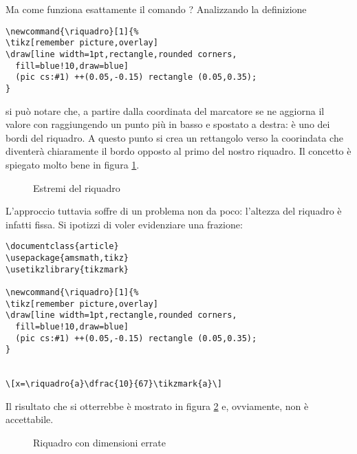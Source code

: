 Ma come funziona esattamente il comando ? Analizzando la definizione
\begin{lstlisting}[frame=lines]
\newcommand{\riquadro}[1]{%
\tikz[remember picture,overlay]
\draw[line width=1pt,rectangle,rounded corners,
  fill=blue!10,draw=blue]
  (pic cs:#1) ++(0.05,-0.15) rectangle (0.05,0.35);
}
\end{lstlisting}
si può notare che, a partire dalla coordinata del marcatore  se ne aggiorna il valore con  raggiungendo un punto più in basso e spostato a destra: è uno dei bordi del riquadro. A questo punto si crea un rettangolo verso la coorindata  che diventerà chiaramente il bordo opposto al primo del nostro riquadro. Il concetto è spiegato molto bene in figura \ref{fig:estremiriquadro}.

\begin{figure}[ht]
\centering
{}
\caption{Estremi del riquadro}
\label{fig:estremiriquadro}
\end{figure}
L'approccio tuttavia soffre di un problema non da poco: l'altezza del riquadro è infatti fissa. Si ipotizzi di voler evidenziare una frazione:
\begin{lstlisting}[frame=lines]
\documentclass{article}
\usepackage{amsmath,tikz}
\usetikzlibrary{tikzmark}

\newcommand{\riquadro}[1]{%
\tikz[remember picture,overlay]
\draw[line width=1pt,rectangle,rounded corners,
  fill=blue!10,draw=blue]
  (pic cs:#1) ++(0.05,-0.15) rectangle (0.05,0.35);
}


\[x=\riquadro{a}\dfrac{10}{67}\tikzmark{a}\]

\end{lstlisting}
Il risultato che si otterrebbe è mostrato in figura \ref{fig:problema} e, ovviamente, non è accettabile.
\begin{figure}[ht]
\centering
{}
\caption{Riquadro con dimensioni errate}
\label{fig:problema}
\end{figure}

